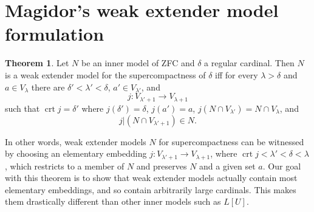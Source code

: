 \documentclass[12pt]{report}
\DeclareMathOperator{\crt}{crt}
\theoremstyle{definition}
\newtheorem{theorem}{Theorem}[chapter]
\begin{document}
\section{Magidor's weak extender model formulation}
\begin{theorem}
\label{magidor weak extender}
Let $N$ be an inner model of ZFC and $\delta$ a regular cardinal.
Then $N$ is a weak extender model for the supercompactness of $\delta$ iff
for every $\lambda > \delta$ and $a \in V_\lambda$ there are $\delta' < \lambda' < \delta$, $a' \in V_{\lambda'}$, and
$$j: V_{\lambda' + 1} \to V_{\lambda + 1}$$
such that $\crt j = \delta'$ where $j(\delta') = \delta$, $j(a') = a$, $j(N \cap V_{\lambda'}) = N \cap V_\lambda$, and
$$j|(N \cap V_{\lambda' + 1}) \in N.$$
\end{theorem}
In other words, weak extender models $N$ for supercompactness can be witnessed by choosing an elementary embedding $j: V_{\lambda' + 1} \to V_{\lambda + 1}$, where $\crt j < \lambda' < \delta < \lambda$, which restricts to a member of $N$ and preserves $N$ and a given set $a$.
Our goal with this theorem is to show that weak extender models actually contain most elementary embeddings, and so contain arbitrarily large cardinals.
This makes them drastically different than other inner models such as $L[U]$.
\end{document}
